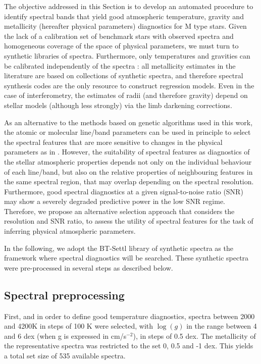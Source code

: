 The objective addressed in this Section is to develop an automated
procedure to identify spectral bands that yield good atmospheric
temperature, gravity and metallicity (hereafter physical parameters)
diagnostics for M type stars. Given the lack of a calibration set of
benchmark stars with observed spectra and homogeneous coverage of the
space of physical parameters, we must turn to synthetic libraries of
spectra. Furthermore, only temperatures and gravities can be
calibrated independently of the spectra \citep[for example as
in][using interferometry]{2003A&A...397L...5S}: all metallicity
estimates in the literature are based on collections of synthetic
spectra, and therefore spectral synthesis codes are the only resource
to construct regression models. Even in the case of interferometry,
the estimates of radii (and therefore gravity) depend on stellar
models (although less strongly) via the limb darkening corrections.

As an alternative to the methods based on genetic algorithms used in
this work, the atomic or molecular line/band parameters can be used in
principle to select the spectral features that are more sensitive to
changes in the physical parameters as
in \cite{2016A&A...587A..19P}. However, the suitability of spectral
features as diagnostics of the stellar atmospheric properties depends
not only on the individual behaviour of each line/band, but also on
the relative properties of neighbouring features in the same spectral
region, that may overlap depending on the spectral
resolution. Furthermore, good spectral diagnostics at a given
signal-to-noise ratio (SNR) may show a severely degraded predictive
power in the low SNR regime. Therefore, we propose an alternative
selection approach that considers the resolution and SNR ratio, 
to assess the utility of spectral features for the task of
inferring physical atmospheric parameters. 

In the following, we adopt the BT-Settl library of synthetic spectra
\citep{2013MSAIS..24..128A} as the framework where spectral
diagnostics will be searched. These synthetic spectra were
pre-processed in several steps as described below.

\subsection{Spectral preprocessing}

First, and in order to define good temperature diagnostics, spectra
between 2000 and 4200K in steps of 100 K were selected, with $\log(g)$
in the range between 4 and 6 dex (when g is expressed in cm/s$^{-2}$),
in steps of 0.5 dex. The metallicity of the representative spectra was
restricted to the set 0, 0.5 and -1 dex.  This yields a total set size
of 535 available spectra.

